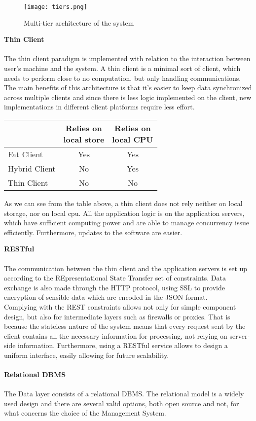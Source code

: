 \begin{figure}[H]
	\centering
	\texttt{[image: tiers.png]}
	\caption{Multi-tier architecture of the system}
\end{figure}  

\noindent
\textbf{Thin Client}\\ \\
The thin client paradigm is implemented with relation to the interaction between user’s machine and the system. A thin client is a minimal sort of client, which needs to perform close to no computation, but only handling communications. The main benefits of this architecture is that it's easier to keep data synchronized across multiple clients and since there is less logic implemented on the client, new implementations in different client platforms require less effort.

\begin{center}
	\begin{tabular}{ l | c | c | }
		  & \makecell{Relies on \\ local store} &   \makecell{Relies on \\ local CPU} \\ \hline
		Fat Client & Yes & Yes  \\ \hline
		Hybrid Client & No & Yes \\ \hline
		Thin Client & No & No \\
		\hline
	\end{tabular}
\end{center}


As we can see from the table above, a thin client does not rely neither on local storage, nor on local cpu. All the application logic is on the application servers, which have sufficient computing power and are able to manage concurrency issue efficiently. Furthermore, updates to the software are easier.

\newpage
\noindent
\textbf{RESTful} \\ \\
The communication between the thin client and the application servers is set up according to the REpresentational State Transfer set of constraints. Data exchange is also made through the HTTP protocol, using SSL to provide encryption of sensible data which are encoded in the JSON format.\\
Complying with the REST constraints allows not only for simple component design, but also for intermediate layers such as firewalls or proxies. That is because the stateless nature of the system means that every request sent by the client contains all the necessary information for processing, not relying on server-side information. Furthermore, using a RESTful service allows to design a uniform interface, easily allowing for future scalability.
\\ \\
\noindent
\textbf{Relational DBMS}\\ \\
The Data layer consists of a relational DBMS.
The relational model is a widely used design and there are several valid options, both open source and not, for what concerns the choice of the Management System.

